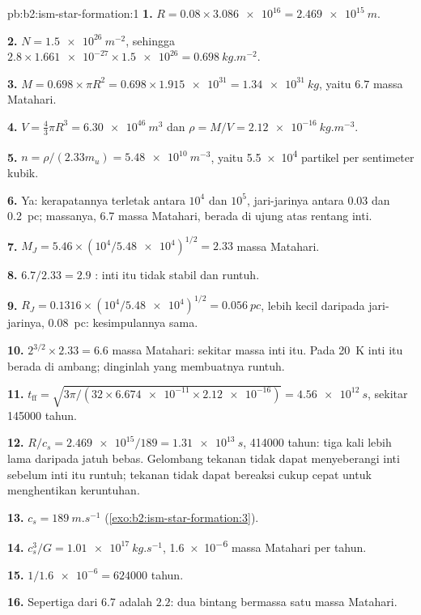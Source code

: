 \begin{solution}{pb:b2:ism-star-formation:1}
\textbf{1.} $R = 0.08\times\num{3.086e16} = \qty{2.469e15}{m}$.

\textbf{2.} $N = \qty{1.5e26}{m^{-2}}$, sehingga $2.8\times\num{1.661e-27}\times\num{1.5e26} =
\qty{0.698}{kg.m^{-2}}$.

\textbf{3.} $M = 0.698\times\pi R^2 = 0.698\times\num{1.915e31} = \qty{1.34e31}{kg}$,
yaitu $6.7$ massa Matahari.

\textbf{4.} $V = \tfrac43\pi R^3 = \qty{6.30e46}{m^3}$ dan
$\rho = M/V = \qty{2.12e-16}{kg.m^{-3}}$.

\textbf{5.} $n = \rho/(2.33m_u) = \qty{5.48e10}{m^{-3}}$, yaitu \num{5.5e4} partikel
per sentimeter kubik.

\textbf{6.} Ya: kerapatannya terletak antara $10^4$ dan $10^5$, jari-jarinya antara 0.03 dan
\qty{0.2}{pc}; massanya, 6.7 massa Matahari, berada di ujung atas rentang inti.

\textbf{7.} $M_J = 5.46\times(10^4/\num{5.48e4})^{1/2} = 2.33$ massa Matahari.

\textbf{8.} $6.7/2.33 = 2.9$ : inti itu tidak stabil dan runtuh.

\textbf{9.} $R_J = 0.1316\times(10^4/\num{5.48e4})^{1/2} = \qty{0.056}{pc}$, lebih kecil daripada
jari-jarinya, \qty{0.08}{pc}: kesimpulannya sama.

\textbf{10.} $2^{3/2}\times2.33 = 6.6$ massa Matahari: sekitar massa inti itu. Pada
\qty{20}{K} inti itu berada di ambang; dinginlah yang membuatnya runtuh.

\textbf{11.} $t_{\mathrm{ff}} = \sqrt{3\pi/(32\times\num{6.674e-11}\times\num{2.12e-16})}
= \qty{4.56e12}{s}$, sekitar \num{145000} tahun.

\textbf{12.} $R/c_s = \num{2.469e15}/189 = \qty{1.31e13}{s}$, \num{414000} tahun: tiga
kali lebih lama daripada jatuh bebas. Gelombang tekanan tidak dapat menyeberangi inti sebelum inti itu
runtuh; tekanan tidak dapat bereaksi cukup cepat untuk menghentikan keruntuhan.

\textbf{13.} $c_s = \qty{189}{m.s^{-1}}$ (\cref{exo:b2:ism-star-formation:3}).

\textbf{14.} $c_s^3/G = \qty{1.01e17}{kg.s^{-1}}$, \num{1.6e-6} massa Matahari per tahun.

\textbf{15.} $1/\num{1.6e-6} = \num{624000}$ tahun.

\textbf{16.} Sepertiga dari 6.7 adalah $2.2$: dua bintang bermassa satu massa Matahari.


\end{solution}
